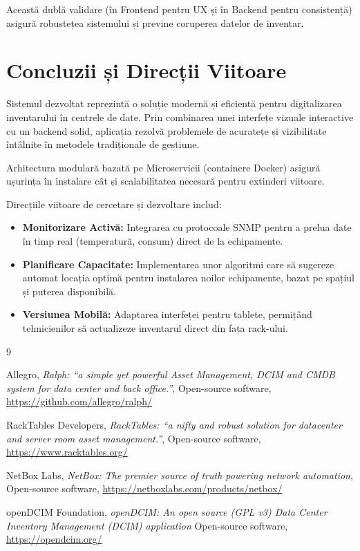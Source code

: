 \documentclass[12pt,a4paper]{article}
\begin{document}
Această dublă validare (în Frontend pentru UX și în Backend pentru consistență) asigură robustețea sistemului și previne coruperea datelor de inventar.

\newpage
\section{Concluzii și Direcții Viitoare}
\label{sec:concluzii}

Sistemul dezvoltat reprezintă o soluție modernă și eficientă pentru digitalizarea inventarului în centrele de date. Prin combinarea unei interfețe vizuale interactive cu un backend solid, aplicația rezolvă problemele de acuratețe și vizibilitate întâlnite în metodele tradiționale de gestiune.

Arhitectura modulară bazată pe Microservicii (containere Docker) asigură ușurința în instalare cât și scalabilitatea necesară pentru extinderi viitoare.

Direcțiile viitoare de cercetare și dezvoltare includ:
\begin{itemize}
    \item \textbf{Monitorizare Activă:} Integrarea cu protocoale SNMP pentru a prelua date în timp real (temperatură, consum) direct de la echipamente.
    \item \textbf{Planificare Capacitate:} Implementarea unor algoritmi care să sugereze automat locația optimă pentru instalarea noilor echipamente, bazat pe spațiul și puterea disponibilă.
    \item \textbf{Versiunea Mobilă:} Adaptarea interfeței pentru tablete, permițând tehnicienilor să actualizeze inventarul direct din fața rack-ului.
\end{itemize}


\newpage
{}
{}
\begin{thebibliography}{9}

Allegro,
\newblock \emph{Ralph: ``a simple yet powerful Asset Management, DCIM and CMDB system for data center and back office.''},
\newblock Open-source software, \url{https://github.com/allegro/ralph/}

RackTables Developers, 
\newblock \emph{RackTables: ``a nifty and robust solution for datacenter and server room asset management.''},
\newblock Open-source software, \url{https://www.racktables.org/}

NetBox Labs,
\newblock \emph{NetBox: The premier source of truth powering network automation},
\newblock Open-source software, \url{https://netboxlabs.com/products/netbox/}

openDCIM Foundation,
\newblock \emph{openDCIM: An open source (GPL v3) Data Center Inventory Management (DCIM) application}
\newblock Open-source software, \url{https://opendcim.org/}

\end{thebibliography}
\end{document}
